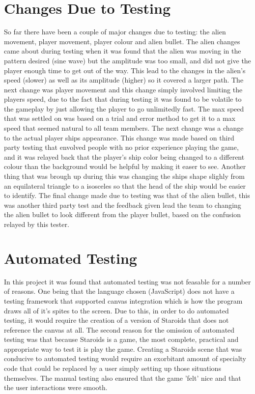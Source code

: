 \documentclass[12pt, titlepage]{article}
\begin{document}
\section{Changes Due to Testing}
So far there have been a couple of major changes due to testing: the alien movement, player movement, player colour and alien bullet. The alien changes came about during testing when it was found that the alien was moving in the pattern desired (sine wave) but the amplitude was too small, and did not give the player enough time to get out of the way. This lead  to the changes in the alien's speed (slower) as well as its amplitude (higher) so it covered a larger path. The next change was player movement and this change simply involved limiting the players speed, due to the fact that during testing it was found to be volatile to the gameplay by just allowing the player to go unlimitedly fast. The max speed that was settled on was based on a trial and error method to get it to a max speed that seemed natural to all team members. The next change was a change to the actual player ships appearance. This change was made based on third party testing that envolved people with no prior experience playing the game, and it was relayed back that the player's ship color being changed to a different colour than the background would be helpful by making it easer to see. Another thing that was brough up during this was changing the ships shape slighly from an equilateral triangle to a isosceles so that the head of the ship would be easier to identify. The final change made due to testing was that of the alien bullet, this was another third party test and the feedback given lead the team to changing the alien bullet to look  different from the player bullet, based on the confusion relayed by this tester.

\section{Automated Testing}
In this project it was found that automated testing was not feasable for a number of reasons. One being that the language chosen (JavaScript) does not have a testing framework that supported canvas integration which is how the program draws all of it's spites to the screen. Due to this, in order to do automated testing, it would require the creation of a version of Staroids that does not reference the canvas at all. The second reason for the omission of automated testing was that because Staroids is a game, the most complete, practical and appropriate way to test it is play the game. Creating a Staroids scene that was conducive to automated testing would require an exorbitant amount of specialty code that could be replaced by a user simply setting up those situations themselves. The manual testing also ensured that the game 'felt' nice and that the user interactions were smooth.
\end{document}
